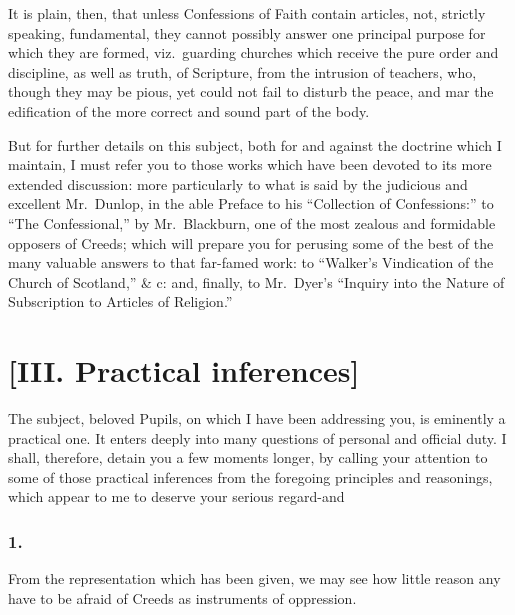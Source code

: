 \documentclass[
]{book}
\begin{document}
It is plain, then, that unless Confessions of Faith contain articles, not, strictly speaking, fundamental, they cannot possibly answer one principal purpose for which they are formed, viz.~guarding churches which receive the pure order and discipline, as well as truth, of Scripture, from the intrusion of teachers, who, though they may be pious, yet could not fail to disturb the peace, and mar the edification of the more correct and sound part of the body.

But for further details on this subject, both for and against the doctrine which I maintain, I must refer you to those works which have been devoted to its more extended discussion: more particularly to what is said by the judicious and excellent Mr.~Dunlop, in the able Preface to his ``Collection of Confessions:'' to ``The Confessional,'' by Mr.~Blackburn, one of the most zealous and formidable opposers of Creeds; which will prepare you for perusing some of the best of the many valuable answers to that far-famed work: to ``Walker's Vindication of the Church of Scotland,'' \& c: and, finally, to Mr.~Dyer's ``Inquiry into the Nature of Subscription to Articles of Religion.''

\hypertarget{iii.-practical-inferences}{%
\section*{{[}III. Practical inferences{]}}\label{iii.-practical-inferences}}

The subject, beloved Pupils, on which I have been addressing you, is eminently a practical one. It enters deeply into many questions of personal and official duty. I shall, therefore, detain you a few moments longer, by calling your attention to some of those practical inferences from the foregoing principles and reasonings, which appear to me to deserve your serious regard-and

\hypertarget{section-12}{%
\subsubsection*{1.}\label{section-12}}

From the representation which has been given, we may see how little reason any have to be afraid of Creeds as instruments of oppression.
\end{document}
